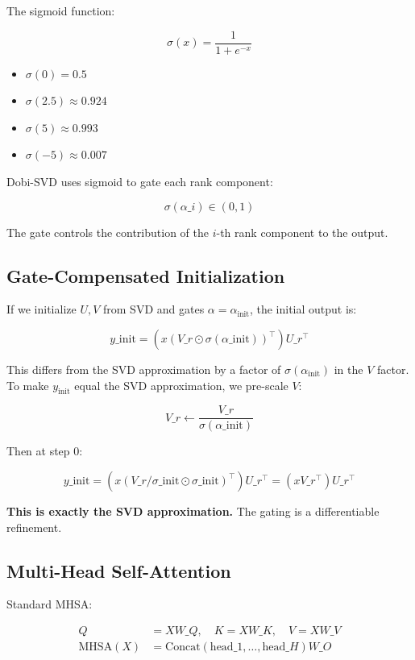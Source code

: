 The sigmoid function:

\[
\sigma(x) = \frac{1}{1 + e^{-x}}
\tag{3.4}
\]

\begin{itemize}
\item $\sigma(0) = 0.5$
\item $\sigma(2.5) \approx 0.924$
\item $\sigma(5) \approx 0.993$
\item $\sigma(-5) \approx 0.007$

\end{itemize}
Dobi-SVD uses sigmoid to gate each rank component:

\[
\sigma(\alpha\_i) \in (0, 1)
\tag{3.5}
\]

The gate controls the contribution of the $i$-th rank component to the 
output.

\subsection{Gate-Compensated Initialization}

If we initialize $U, V$ from SVD and gates $\alpha = \alpha_\text{init}$, 
the initial output is:

\[
y\_\text{init} = (x (V\_r \odot \sigma(\alpha\_\text{init}))^\top) U\_r^\top
\tag{3.6}
\]

This differs from the SVD approximation by a factor of $\sigma(\alpha_\text{init})$ 
in the $V$ factor. To make $y_\text{init}$ equal the SVD approximation, 
we pre-scale $V$:

\[
V\_r \leftarrow \frac{V\_r}{\sigma(\alpha\_\text{init})}
\tag{3.7}
\]

Then at step 0:

\[
y\_\text{init} = (x (V\_r / \sigma\_\text{init} \odot \sigma\_\text{init})^\top) U\_r^\top = (x V\_r^\top) U\_r^\top
\tag{3.8}
\]

\textbf{This is exactly the SVD approximation.} The gating is a differentiable 
refinement.

\subsection{Multi-Head Self-Attention}

Standard MHSA:

\[
\begin{aligned}
Q &= X W\_Q, \quad K = X W\_K, \quad V = X W\_V \\
\text{MHSA}(X) &= \text{Concat}(\text{head}\_1, \dots, \text{head}\_H) W\_O
\end{aligned}
\tag{3.9}
\]

